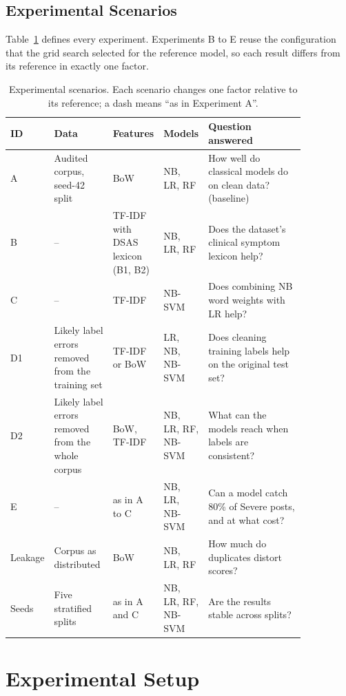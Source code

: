 \documentclass[conference]{IEEEtran}
\begin{document}
\subsection{Experimental Scenarios}\label{sec:scen}

Table~\ref{tab:scen} defines every experiment. Experiments B to E reuse the configuration that the grid search selected for the reference model, so each result differs from its reference in exactly one factor.

\begin{table}[!t]
\centering
\caption{Experimental scenarios. Each scenario changes one factor relative to its reference; a dash means ``as in Experiment A''.}
\label{tab:scen}
\footnotesize
\begin{tabular}{lp{0.2\linewidth}p{0.17\linewidth}p{0.13\linewidth}p{0.35\linewidth}}
\toprule
ID & Data & Features & Models & Question answered \\
\midrule
A & Audited corpus, seed-42 split & BoW & NB, LR, RF & How well do classical models do on clean data? (baseline) \\
B & -- & TF-IDF with DSAS lexicon (B1, B2) & NB, LR, RF & Does the dataset's clinical symptom lexicon help? \\
C & -- & TF-IDF & NB-SVM & Does combining NB word weights with LR help? \\
D1 & Likely label errors removed from the training set & TF-IDF or BoW & LR, NB, NB-SVM & Does cleaning training labels help on the original test set? \\
D2 & Likely label errors removed from the whole corpus & BoW, TF-IDF & NB, LR, RF, NB-SVM & What can the models reach when labels are consistent? \\
E & -- & as in A to C & NB, LR, NB-SVM & Can a model catch 80\% of Severe posts, and at what cost? \\
Leakage & Corpus as distributed & BoW & NB, LR, RF & How much do duplicates distort scores? \\
Seeds & Five stratified splits & as in A and C & NB, LR, RF, NB-SVM & Are the results stable across splits? \\
\bottomrule
\end{tabular}
\end{table}

\section{Experimental Setup}
\end{document}
